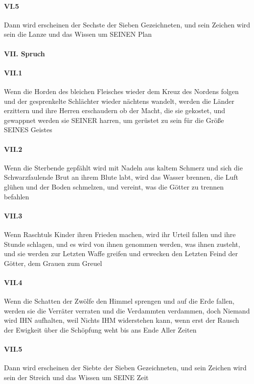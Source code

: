 \paragraph{VI.5} Dann wird erscheinen der Sechste der Sieben Gezeichneten, und sein Zeichen wird sein die Lanze und das Wissen um SEINEN Plan

\paragraph{VII. Spruch}

\paragraph{VII.1} Wenn die Horden des bleichen Fleisches wieder dem Kreuz des Nordens folgen und der gesprenkelte Schlächter wieder nächtens wandelt, werden die Länder erzittern und ihre Herren erschaudern ob der Macht, die sie gekostet, und gewappnet werden sie SEINER harren, um gerüstet zu sein für die Größe SEINES Geistes

\paragraph{VII.2} Wenn die Sterbende gepfählt wird mit Nadeln aus kaltem Schmerz und sich die Schwarzfaulende Brut an ihrem Blute labt, wird das Wasser brennen, die Luft glühen und der Boden schmelzen, und vereint, was die Götter zu trennen befahlen

\paragraph{VII.3} Wenn Raschtuls Kinder ihren Frieden machen, wird ihr Urteil fallen und ihre Stunde schlagen, und es wird von ihnen genommen werden, was ihnen zusteht, und sie werden zur Letzten Waffe greifen und erwecken den Letzten Feind der Götter, dem Grauen zum Greuel

\paragraph{VII.4} Wenn die Schatten der Zwölfe den Himmel sprengen und auf die Erde fallen, werden sie die Verräter verraten und die Verdammten verdammen, doch Niemand wird IHN aufhalten, weil Nichts IHM widerstehen kann, wenn erst der Rausch der Ewigkeit über die Schöpfung weht bis ans Ende Aller Zeiten

\paragraph{VII.5} Dann wird erscheinen der Siebte der Sieben Gezeichneten, und sein Zeichen wird sein der Streich und das Wissen um SEINE Zeit \newline

